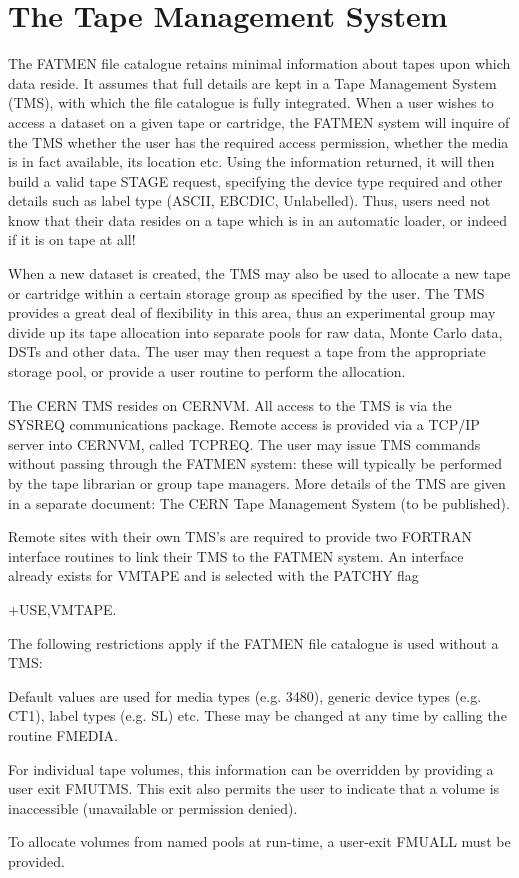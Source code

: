 \section{The Tape Management System}
\par
The FATMEN file catalogue retains minimal information about tapes
upon which data reside. It assumes that full details are kept
in a Tape Management System (TMS), with which the file catalogue
is fully integrated. When a user wishes to access a dataset
on a given tape or cartridge,
the FATMEN system will inquire of
the TMS whether the user has the required access permission, whether the
media is in fact available, its location etc. Using the information
returned, it will then build a valid tape STAGE request,
specifying the device type required and other details such as label
type (ASCII, EBCDIC, Unlabelled). Thus, users need not know that
their data resides on a tape which is in an automatic loader, or indeed
if it is on tape at all!
\par
When a new dataset is created, the TMS may also be used to allocate
a new tape or cartridge within a certain storage group as specified
by the user. The TMS provides a great deal of flexibility in this
area, thus an experimental group may divide up its tape allocation
into separate pools for raw data, Monte Carlo data, DSTs and other
data. The user may then request a tape from the appropriate
storage pool, or provide a user routine to perform the allocation.
\par
{}
The CERN TMS resides on CERNVM. All access to the TMS is via the
SYSREQ communications package. Remote access is provided via a TCP/IP
server into CERNVM, called TCPREQ. The user may issue TMS commands
without passing through the FATMEN system: these will typically
be performed by the tape librarian or group tape managers.
More details of the TMS are given in a separate document: The CERN
Tape Management System (to be published).
\par
Remote sites with their own TMS's are required to provide two
FORTRAN interface routines to link their TMS to the FATMEN system.
An interface already exists for VMTAPE and is selected with the
PATCHY flag
\begin{XMP}
+USE,VMTAPE.
\end{XMP}
\par
The following restrictions apply if the FATMEN
file catalogue is used without a TMS:
\begin{OL}
\item
Default values are used for media types (e.g. 3480), generic device types
(e.g. CT1), label types (e.g. SL) etc. These may
be changed at any time by calling the routine FMEDIA.
\item
For individual tape volumes, this information can be overridden
by providing a user exit FMUTMS. This exit also permits
the user to indicate that a volume is inaccessible (unavailable
or permission denied).
\item
To allocate volumes from named pools at run-time, a user-exit
FMUALL must be provided.
\end{OL}
